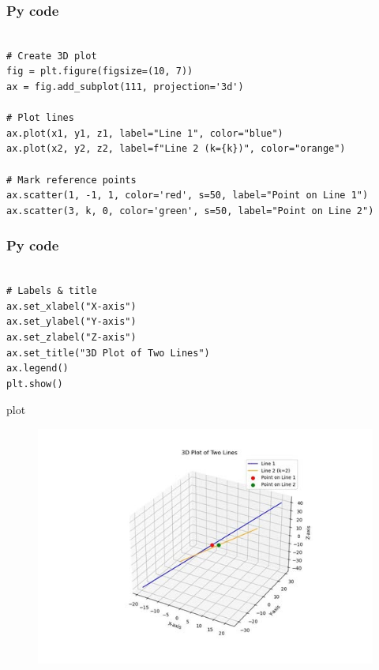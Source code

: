\documentclass{beamer}
\begin{document}
\begin{frame}[fragile]
    \frametitle{Py code}
    \begin{lstlisting}

# Create 3D plot
fig = plt.figure(figsize=(10, 7))
ax = fig.add_subplot(111, projection='3d')

# Plot lines
ax.plot(x1, y1, z1, label="Line 1", color="blue")
ax.plot(x2, y2, z2, label=f"Line 2 (k={k})", color="orange")

# Mark reference points
ax.scatter(1, -1, 1, color='red', s=50, label="Point on Line 1")
ax.scatter(3, k, 0, color='green', s=50, label="Point on Line 2")
 \end{lstlisting}
\end{frame}
\begin{frame}[fragile]
    \frametitle{Py code}
    \begin{lstlisting}

# Labels & title
ax.set_xlabel("X-axis")
ax.set_ylabel("Y-axis")
ax.set_zlabel("Z-axis")
ax.set_title("3D Plot of Two Lines")
ax.legend()
plt.show()
\end{lstlisting}
\end{frame}
\begin{frame}{plot}
\begin{figure}[h]
    \centering
    \includegraphics[scale=0.5]{figs/4.13.85.png}
    \caption{}
    \label{fig:1}
\end{figure}
\end{frame}
\end{document}
